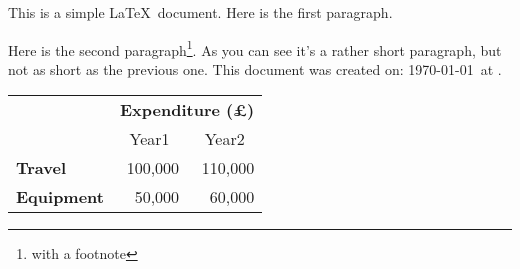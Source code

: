 \documentclass[12pt]{scrartcl}
\begin{document}
This is a simple \LaTeX\ document. Here is the first paragraph.

Here is the second paragraph\footnote{with a footnote}. As you
can see it's a rather short paragraph, but not as short as the
previous one. This document was created on: \today\ at \currenttime.

\begin{tabular}{lrr}
                     & \multicolumn{2}{c}{\bfseries Expenditure (\pounds)} \\
                     & \multicolumn{1}{c}{Year1} & \multicolumn{1}{c}{Year2} \\
 \bfseries Travel    & 100,000 & 110,000 \\
 \bfseries Equipment & 50,000  & 60,000
\end{tabular}
\end{document}
